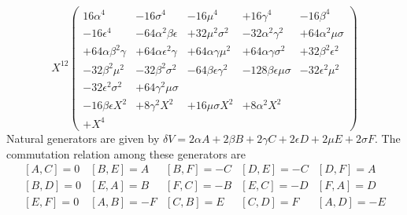\documentclass[12pt]{article}
\begin{document}
\begin{displaymath}
X^{12} \left(
\begin{array}{ccccc}
16\alpha^4 & -16\sigma^4 & -16\mu^4 & +16\gamma^4 & -16\beta^4 \\
-16\epsilon^4 & -64\alpha^2\beta\epsilon  & +32\mu^2\sigma^2 &
-32\alpha^2\gamma^2 & +64\alpha^2\mu\sigma \\
+64\alpha\beta^2\gamma & +64\alpha\epsilon^2\gamma & +64\alpha\gamma\mu^2 &
+64\alpha\gamma\sigma^2 & +32\beta^2\epsilon^2 \\
-32\beta^2\mu^2 & -32\beta^2\sigma^2 & -64\beta\epsilon\gamma^2 &
-128\beta\epsilon\mu\sigma & -32\epsilon^2\mu^2 \\
-32\epsilon^2\sigma^2 & +64\gamma^2\mu\sigma & & & \\
-16\beta\epsilon X^2 & +8\gamma^2 X^2 & +16\mu\sigma X^2 & +8\alpha^2 X^2 & \\
+X^4 & & & &
\end{array}
\right)
\end{displaymath}
 Natural generators are given by $\delta V = 2\alpha A + 2\beta B +
2\gamma C + 2\epsilon D + 2\mu E + 2\sigma F$.
The commutation relation among these generators are
\begin{displaymath}
\begin{array}{ccccc}
\left[A,C\right]=0 & \left[B,E\right]=A & \left[B,F\right]=-C &
\left[D,E\right]=-C & \left[D,F\right]=A \\
\left[B,D\right]=0 & \left[E,A\right]=B & \left[F,C\right]=-B &
\left[E,C\right]=-D & \left[F,A\right]=D \\
\left[E,F\right]=0 & \left[A,B\right]=-F & \left[C,B\right]=E &
\left[C,D\right]=F & \left[A,D\right]=-E
\end{array}
\end{displaymath}
\end{document}
